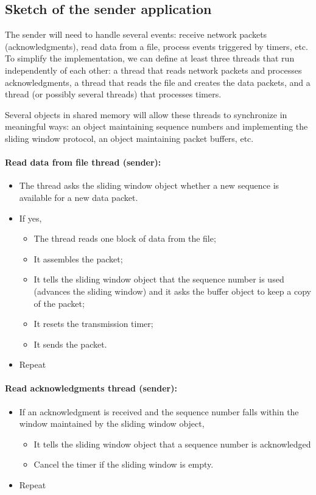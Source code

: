 \documentclass[12pt]{book}
\begin{document}
\subsection{Sketch of the sender application} 

The sender will need to handle several events: receive network packets (acknowledgments), read data from a file, process events triggered by timers, etc. To simplify the implementation, we can define at least three threads that run independently of each other: a thread that reads network packets and processes acknowledgments, a thread that reads the file and creates the data packets, and a thread (or possibly several threads) that processes timers.

Several objects in shared memory will allow these threads to synchronize in meaningful ways: an object maintaining sequence numbers and implementing the sliding window protocol, an object maintaining packet buffers, etc.

\paragraph{Read data from file thread (sender):}

\begin{itemize}
\item The thread asks the sliding window object whether a new sequence is available for a new data packet.
\item If yes,

  \begin{itemize}
  \item  The thread reads one block of data from the file;
  \item It assembles the packet;
  \item It tells the sliding window object that the sequence number is used (advances the sliding window) and it asks the buffer object to keep a copy of the packet;
  \item It resets the transmission timer;
  \item It sends the packet.
  \end{itemize}
\item Repeat
\end{itemize}

\paragraph{Read acknowledgments thread (sender):}

\begin{itemize}
\item If an acknowledgment is received and the sequence number falls within the window maintained by the sliding window object,
  \begin{itemize}
  \item It tells the sliding window object that a sequence number is acknowledged
  \item Cancel the timer if the sliding window is empty.
  \end{itemize}
\item Repeat
\end{itemize}
\end{document}
